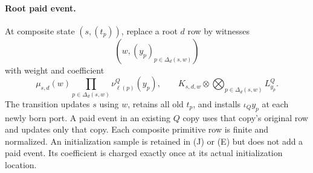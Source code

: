 \documentclass[11pt]{article}
\begin{document}
\paragraph{Root paid event.}
At composite state $(s,(t_p))$, replace a root $d$ row by witnesses
\[
 \left(w,(y_p)_{p\in\Delta_d(s,w)}\right)
\]
with weight and coefficient
\[
 \mu_{s,d}(w)\prod_{p\in\Delta_d(s,w)}\nu^Q_{\ell(p)}(y_p),
 \qquad K_{s,d,w}\otimes\bigotimes_{p\in\Delta_d(s,w)}L^Q_{y_p}.
                                                               \tag{E}
\]
The transition updates $s$ using $w$, retains all old $t_p$, and installs $\iota_Qy_p$ at each newly born port. A paid event in an existing $Q$ copy uses that copy's original row and updates only that copy. Each composite primitive row is finite and normalized. An initialization sample is retained in (J) or (E) but does not add a paid event. Its coefficient is charged exactly once at its actual initialization location.
\end{document}
